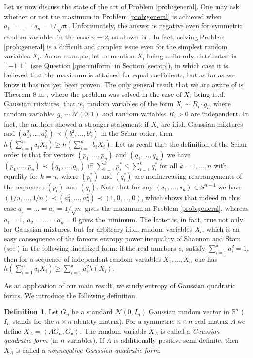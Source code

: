 \documentclass[11pt]{amsart}
\newcommand{\mc}[1]{\mathcal{{#1}}}
\newcommand{\1}{\mathbf{1}}
\newcommand{\R}{\mathbb{R}}
\newcommand{\scal}[2]{\left\langle #1, #2\right\rangle}
\theoremstyle{definition}
\theoremstyle{definition}
\newtheorem{definition}{Definition}
\theoremstyle{remark}
\begin{document}
Let us now discuss the state of the art of Problem \ref{prob:general}. One may ask whether or not the maximum in Problem \ref{prob:general} is achieved when $a_1=\ldots = a_n=1/\sqrt{n}$. Unfortunately, the answer  is negative even for symmetric random variables in the case $n=2$, as shown in \cite{BNT16}. In fact, solving Problem \ref{prob:general} is a difficult and complex issue even for the simplest random variables $X_i$. As an example, let us mention  $X_i$ being uniformly distributed in $[-1,1]$ (see Question \ref{que:uniform} in Section \ref{sec:op}), in which case it is believed that the maximum is attained for equal coefficients, but as far as we know it has not yet been proven. The only general result that we are aware of is Theorem 8 in \cite{ENT18}, where the problem was solved in the case of $X_i$ being i.i.d. Gaussian mixtures, that is, random variables of the form $X_i \sim R_i \cdot g_i$, where random variables $g_i \sim \mc{N}(0,1)$ and random variables $R_i>0$ are independent. In fact, the authors showed a stronger statement: if $X_i$ are i.i.d. Gaussian mixtures and $(a_1^2, \ldots, a_n^2) \prec (b_1^2, \ldots, b_n^2)$ in the Schur order, then $h(\sum_{i=1}^n a_i X_i) \geq h(\sum_{i=1}^n b_i X_i)$. Let us recall that the definition of the Schur order is that for vectors $(p_1, \ldots, p_n)$ and $(q_1, \ldots, q_n)$  we have $(p_1,\ldots, p_n) \prec (q_1,\ldots, q_n)$ iff $\sum_{i=1}^k p_i^\ast \leq \sum_{i=1}^k q_i^\ast$ for all $k=1,\ldots, n$ with equality for $k=n$, where $(p_i^\ast)$ and $(q_i^\ast)$ are nonincreasing rearrangements of the sequences $(p_i)$ and $(q_i)$. Note that for any $(a_1,\ldots, a_n) \in S^{n-1}$ we have $(1/n, \ldots, 1/n) \prec (a_1^2, \ldots, a_n^2) \prec (1,0,\ldots, 0)$, which shows that indeed in this case $a_1= \ldots = a_n= 1/\sqrt{n}$ gives the maximum in Problem \ref{prob:general}, whereas $a_1=1$, $a_2=\ldots=a_n=0$ gives the minimum. The latter is, in fact, true not only for Gaussian mixtures, but for arbitrary i.i.d. random variables $X_i$, which is an easy consequence of the famous entropy power inequality of Shannon and Stam (see \cite{S48, S59}) in the following linearized form: if the real numbers $a_i$ satisfy $\sum_{i=1}^n a_i^2=1$, then for a sequence of independent random variables $X_1, \ldots, X_n$ one has $h(\sum_{i=1}^n a_i X_i) \geq \sum_{i=1}^n a_i^2 h(X_i)$.   


As an application of our main result, we study entropy of Gaussian quadratic forms. We introduce the following definition.


\begin{definition}
Let $G_n$ be a standard $\mc{N}(0,I_n)$ Gaussian random vector in $\R^n$ ($I_n$ stands for the $n \times n$ identity matrix). For a symmetric $n \times n$ real matrix $A$ we define $X_A = \scal{AG_n}{G_n}$. The random variable $X_A$ is called a \emph{Gaussian quadratic form} (in $n$ variables). If $A$ is additionally positive semi-definite, then $X_A$ is called a \emph{nonnegative Gaussian quadratic form}.
\end{definition}
\end{document}
